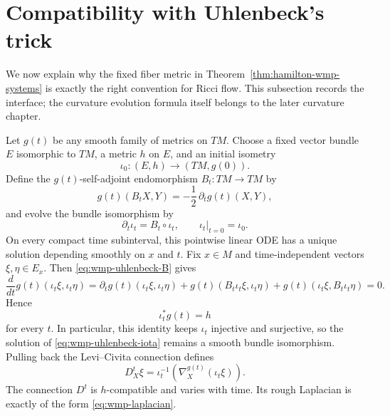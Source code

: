 \documentclass[10pt]{coll-l}
\theoremstyle{definition}
\theoremstyle{remark}
\numberwithin{section}{chapter}
\numberwithin{equation}{chapter}
\begin{document}
\section{Compatibility with Uhlenbeck's trick}
\label{sec:wmp-uhlenbeck}

We now explain why the fixed fiber metric in
Theorem~\ref{thm:hamilton-wmp-systems} is exactly the right convention for
Ricci flow.  This subsection records the interface; the curvature evolution
formula itself belongs to the later curvature chapter.

Let $g(t)$ be any smooth family of metrics on $TM$.  Choose a fixed vector
bundle $E$ isomorphic to $TM$, a metric $h$ on $E$, and an initial isometry
\[
       \iota_0:(E,h)\longrightarrow(TM,g(0)).
\]
Define the $g(t)$-self-adjoint endomorphism $B_t:TM\to TM$ by
\begin{equation}
       g(t)(B_tX,Y)=-\frac12\,\partial_tg(t)(X,Y),          \label{eq:wmp-uhlenbeck-B}
\end{equation}
and evolve the bundle isomorphism by
\begin{equation}
       \partial_t\iota_t=B_t\circ\iota_t,\qquad
       \iota_t|_{t=0}=\iota_0.                             \label{eq:wmp-uhlenbeck-iota}
\end{equation}
On every compact time subinterval, this pointwise linear ODE has a unique
solution depending smoothly on $x$ and $t$.  Fix $x\in M$ and
time-independent vectors $\xi,\eta\in E_x$.  Then
\eqref{eq:wmp-uhlenbeck-B} gives
\[
 \frac{d}{dt}g(t)(\iota_t\xi,\iota_t\eta)
   =\partial_tg(t)(\iota_t\xi,\iota_t\eta)
    +g(t)(B_t\iota_t\xi,\iota_t\eta)
    +g(t)(\iota_t\xi,B_t\iota_t\eta)
   =0.
\]
Hence
\[
       \iota_t^*g(t)=h
\]
for every $t$.  In particular, this identity keeps $\iota_t$ injective and
surjective, so the solution of \eqref{eq:wmp-uhlenbeck-iota} remains a
smooth bundle isomorphism.  Pulling back the Levi--Civita connection defines
\begin{equation}
 D^t_X\xi
   =\iota_t^{-1}\!\left(
       \nabla^{g(t)}_X(\iota_t\xi)\right).                 \label{eq:wmp-pulled-connection}
\end{equation}
The connection $D^t$ is $h$-compatible and varies with time.  Its rough
Laplacian is exactly of the form
\eqref{eq:wmp-laplacian}.
\end{document}
